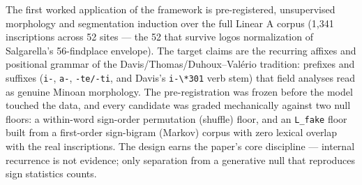\documentclass[
  10pt,
]{article}
\begin{document}
The first worked application of the framework is pre-registered,
unsupervised morphology and segmentation induction over the full Linear
A corpus (1,341 inscriptions across 52 sites --- the 52 that survive
logos normalization of Salgarella's 56-findplace envelope). The target
claims are the recurring affixes and positional grammar of the
Davis/Thomas/Duhoux--Valério tradition: prefixes and suffixes
(\texttt{i-}, \texttt{a-}, \texttt{-te/-ti}, and Davis's
\texttt{i-\textbackslash{}*301} verb stem) that field analyses read as
genuine Minoan morphology. The pre-registration was frozen before the
model touched the data, and every candidate was graded mechanically
against two null floors: a within-word sign-order permutation (shuffle)
floor, and an \texttt{L\_fake} floor built from a first-order
sign-bigram (Markov) corpus with zero lexical overlap with the real
inscriptions. The design earns the paper's core discipline --- internal
recurrence is not evidence; only separation from a generative null that
reproduces sign statistics counts.
\end{document}
